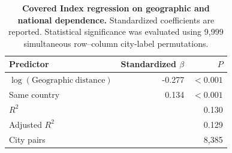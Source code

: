 \begin{table}[!htbp]
\centering
\caption{\textbf{Covered Index regression on geographic and national dependence.} Standardized coefficients are reported. Statistical significance was evaluated using 9,999 simultaneous row--column city-label permutations.}
\label{tab:ci-geography-country-regression}
\begin{tabular}{lrr}
\toprule
Predictor & Standardized $\beta$ & $P$ \\
\midrule
$\log(\mathrm{Geographic\ distance})$ & -0.277 & $<0.001$ \\
Same country & 0.134 & $<0.001$ \\
\midrule
$R^2$ & \multicolumn{2}{r}{0.130} \\
Adjusted $R^2$ & \multicolumn{2}{r}{0.129} \\
City pairs & \multicolumn{2}{r}{8,385} \\
\bottomrule
\end{tabular}
\end{table}
